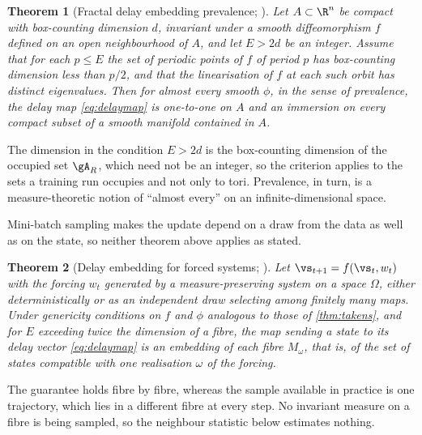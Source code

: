 \documentclass{article}
\newtheorem{theorem}{Theorem}
\begin{document}
\begin{theorem}[Fractal delay embedding prevalence; \citealp{sauer1991embedology}]\label{thm:sauer}
Let $A \subset \R^{n}$ be compact with box-counting dimension $d$, invariant under a smooth
diffeomorphism $f$ defined on an open neighbourhood of $A$, and let $E > 2d$ be an integer. Assume
that for each $p \le E$ the set of periodic points of $f$ of period $p$ has box-counting dimension
less than $p/2$, and that the linearisation of $f$ at each such orbit has distinct eigenvalues.
Then for almost every smooth $\phi$, in the sense of prevalence, the delay map \cref{eq:delaymap}
is one-to-one on $A$ and an immersion on every compact subset of a smooth manifold contained
in $A$.
\end{theorem}

The dimension in the condition $E > 2d$ is the box-counting dimension of the occupied set $\gA_R$,
which need not be an integer, so the criterion applies to the sets a training run occupies and not
only to tori. Prevalence, in turn, is a measure-theoretic notion of ``almost every'' on an
infinite-dimensional space.

Mini-batch sampling makes the update depend on a draw from the data as well as on the state, so
neither theorem above applies as stated.

\begin{theorem}[Delay embedding for forced systems;
\citealp{stark1999delay, stark2003delay}]\label{thm:stark}
Let $\vs_{t+1} = f(\vs_t, w_t)$ with the forcing $w_t$ generated by a measure-preserving system on a
space $\Omega$, either deterministically or as an independent draw selecting among finitely many
maps. Under genericity conditions on $f$ and $\phi$ analogous to those of \cref{thm:takens}, and
for $E$ exceeding twice the dimension of a fibre, the map sending a state to its delay vector
\cref{eq:delaymap} is an embedding \emph{of each fibre} $M_{\omega}$, that is, of the set of states
compatible with one realisation $\omega$ of the forcing.
\end{theorem}

The guarantee holds fibre by fibre, whereas the sample available in practice is one trajectory,
which lies in a different fibre at every step. No invariant measure on a fibre is being sampled, so
the neighbour statistic below estimates nothing.
\end{document}
